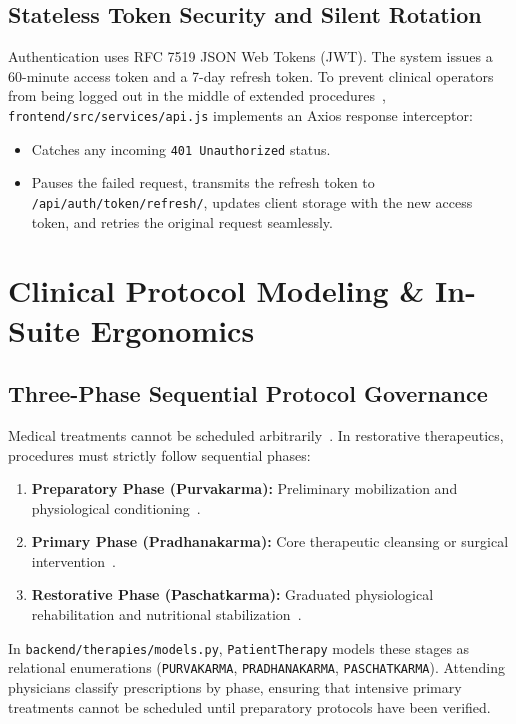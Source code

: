 \documentclass[conference]{IEEEtran}
\begin{document}
\subsection{Stateless Token Security and Silent Rotation}
Authentication uses RFC 7519 JSON Web Tokens (JWT). The system issues a 60-minute access token and a 7-day refresh token. To prevent clinical operators from being logged out in the middle of extended procedures~\cite{singh2008holistic}, \texttt{frontend/src/services/api.js} implements an Axios response interceptor:
\begin{itemize}
    \item Catches any incoming \texttt{401 Unauthorized} status.
    \item Pauses the failed request, transmits the refresh token to \texttt{/api/auth/token/refresh/}, updates client storage with the new access token, and retries the original request seamlessly.
\end{itemize}

\section{Clinical Protocol Modeling \& In-Suite Ergonomics}

\subsection{Three-Phase Sequential Protocol Governance}
Medical treatments cannot be scheduled arbitrarily~\cite{singh2008holistic}. In restorative therapeutics, procedures must strictly follow sequential phases:
\begin{enumerate}
    \item \textbf{Preparatory Phase (Purvakarma):} Preliminary mobilization and physiological conditioning~\cite{singh2008holistic}.
    \item \textbf{Primary Phase (Pradhanakarma):} Core therapeutic cleansing or surgical intervention~\cite{singh2008holistic}.
    \item \textbf{Restorative Phase (Paschatkarma):} Graduated physiological rehabilitation and nutritional stabilization~\cite{singh2008holistic}.
\end{enumerate}

In \texttt{backend/therapies/models.py}, \texttt{PatientTherapy} models these stages as relational enumerations (\texttt{PURVAKARMA}, \texttt{PRADHANAKARMA}, \texttt{PASCHATKARMA}). Attending physicians classify prescriptions by phase, ensuring that intensive primary treatments cannot be scheduled until preparatory protocols have been verified.
\end{document}
